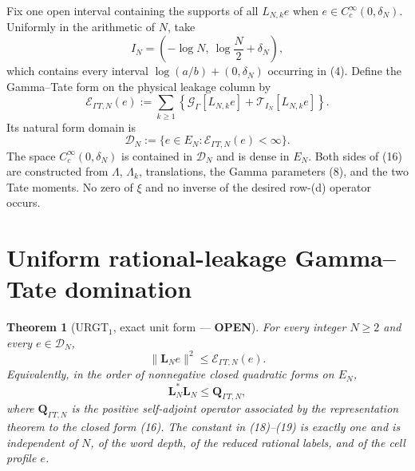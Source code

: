 \documentclass[11pt]{article}
\newcommand{\OPEN}{\textcolor{red!70!black}{\textbf{OPEN}}}
\newtheorem{theorem}{Theorem}
\begin{document}
Fix one open interval containing the supports of all $L_{N,k}e$ when
$e\in C_c^\infty(0,\delta_N)$.  Uniformly in the arithmetic of $N$, take
\begin{equation}
 I_N=\left(-\log N,\ \log\frac N2+\delta_N\right),          \tag{15}
\end{equation}
which contains every interval
$\log(a/b)+(0,\delta_N)$ occurring in (4).  Define the Gamma--Tate form
on the physical leakage column by
\begin{equation}
 \mathcal E_{\Gamma T,N}(e)
 :=\sum_{k\ge1}
 \left\{\mathcal G_\Gamma[L_{N,k}e]
             +\mathcal T_{I_N}[L_{N,k}e]\right\}.           \tag{16}
\end{equation}
Its natural form domain is
\begin{equation}
 \mathscr D_N:=\{e\in E_N:\mathcal E_{\Gamma T,N}(e)<\infty\}.
                                                                    \tag{17}
\end{equation}
The space $C_c^\infty(0,\delta_N)$ is contained in $\mathscr D_N$ and is
dense in $E_N$.  Both sides of (16) are constructed from $\Lambda$,
$\Lambda_k$, translations, the Gamma parameters (8), and the two Tate
moments.  No zero of $\xi$ and no inverse of the desired row-(d) operator
occurs.

\section{Uniform rational-leakage Gamma--Tate domination}

\begin{theorem}[URGT$_1$, exact unit form --- \OPEN]
For every integer $N\ge2$ and every $e\in\mathscr D_N$,
\begin{equation}
 \boxed{
        \|\mathbf L_Ne\|^2
        \le \mathcal E_{\Gamma T,N}(e).}                  \tag{18}
\end{equation}
Equivalently, in the order of nonnegative closed quadratic forms on
$E_N$,
\begin{equation}
 \boxed{
        \mathbf L_N^*\mathbf L_N
        \le \mathbf Q_{\Gamma T,N},}                       \tag{19}
\end{equation}
where $\mathbf Q_{\Gamma T,N}$ is the positive self-adjoint operator
associated by the representation theorem to the closed form (16).
The constant in (18)--(19) is exactly one and is independent of
$N$, of the word depth, of the reduced rational labels, and of the cell
profile $e$.
\end{theorem}
\end{document}
